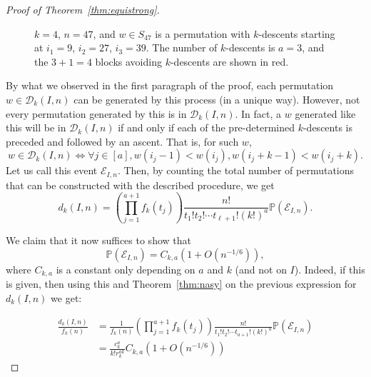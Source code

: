 \documentclass{amsart}
\theoremstyle{definition}
\begin{document}
\begin{proof}[Proof of Theorem~\ref{thm:equistrong}]
\begin{figure}


    \caption{$k=4$, $n=47$, and $w\in S_{47}$ is a permutation with $k$-descents starting at $i_1=9$, $i_2=27$, $i_3=39$. The number of $k$-descents is $a=3$, and the $3+1=4$ blocks avoiding $k$-descents are shown in red.}
    \label{fig:blocks}
\end{figure}

By what we observed in the first paragraph of the proof, each permutation $w\in \mathcal{D}_k(I,n)$ can be generated by this process (in a unique way). However, not every permutation generated by this is in $\mathcal{D}_k(I,n)$. In fact, a $w$ generated like this will be in $\mathcal{D}_k(I,n)$ if and only if each of the pre-determined $k$-descents is preceded and followed by an ascent. That is, for such $w$, \[w\in \mathcal{D}_k(I,n)\iff \forall j\in [a], w(i_j-1)<w(i_j),w(i_j+k-1)<w(i_j+k).\]
Let us call this event $\mathcal{E}_{I,n}$. Then, by counting the total number of permutations that can be constructed with the described procedure, we get
\[d_k(I,n)=\left(\prod_{j=1}^{a+1}f_k(t_j)\right)\frac{n!}{t_1!t_2!\cdots t_{\ell+1}!\left(k!\right)^a}\mathbb{P}(\mathcal{E}_{I,n}).\]

We claim that it now suffices to show that \[\mathbb{P}(\mathcal{E}_{I,n})=C_{k,a}\left(1+O\left(n^{-1/6}\right)\right),\] where $C_{k,a}$ is a constant only depending on $a$ and $k$ (and not on $I$). Indeed, if this is given, then using this and Theorem~\ref{thm:nasy} on the previous expression for $d_k(I,n)$ we get:

\begin{align*}
    \frac{d_k(I,n)}{f_k(n)}&=\frac{1}{f_k(n)}\left(\prod_{j=1}^{a+1}f_k(t_j)\right)\frac{n!}{t_1!t_2!\cdots t_{a+1}!\left(k!\right)^a}\mathbb{P}(\mathcal{E}_{I,n})\\
    &=\frac{c_k^a}{k!r_k^{ak}}C_{k,a}\left(1+O\left(n^{-1/6}\right)\right)
\end{align*}


\end{proof}
\end{document}
